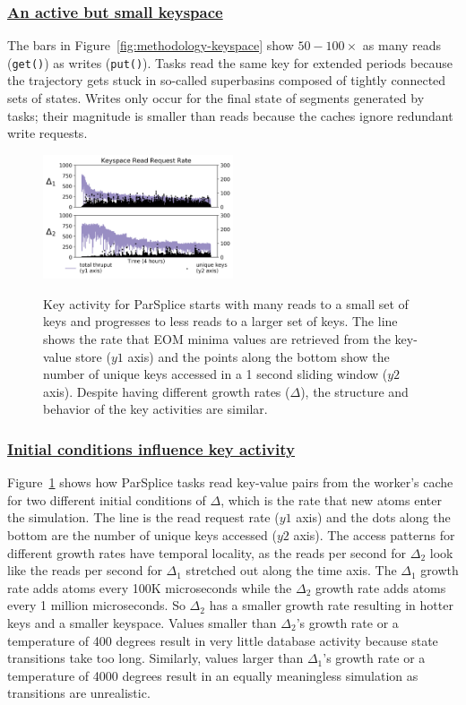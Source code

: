 \subsubsection{\underline{An active but small keyspace}}

The bars in Figure~\ref{fig:methodology-keyspace} show \(50-100\times\) as many
reads (\texttt{get()}) as writes (\texttt{put()}).  Tasks read the same key for
extended periods because the trajectory gets stuck in so-called superbasins
composed of tightly connected sets of states.  Writes only occur for the final
state of segments generated by tasks; their magnitude is smaller than reads
because the caches ignore redundant write requests. 

\begin{figure}[t]
  \noindent\includegraphics[width=0.5\textwidth]{figures/motivation-regimes.png}\\
  \caption{Key activity for ParSplice starts with many reads to a small set of
keys and progresses to less reads to a larger set of keys.  The line shows the
rate that EOM minima values are retrieved from the key-value store (\(y1\)
axis) and the points along the bottom show the number of unique keys accessed in a 1
second sliding window (\(y2\) axis). Despite having different growth rates
(\(\Delta\)), the structure and behavior of the key activities are similar.
\label{fig:motivation-regimes}}
\end{figure}

\subsubsection{\underline{Initial conditions influence key activity}}
\label{sec:delta}
Figure~\ref{fig:motivation-regimes} shows how ParSplice tasks read key-value
pairs from the worker's cache for two different initial conditions of
\(\Delta\), which is the rate that new atoms enter the simulation.  The line is
the read request rate (\(y1\) axis) and the dots along the bottom are the
number of unique keys accessed (\(y2\) axis).  The access patterns for
different growth rates have temporal locality, as the reads per second for
\(\Delta_2\) look like the reads per second for \(\Delta_1\) stretched out
along the time axis.  The \(\Delta_1\) growth rate adds atoms every 100K
microseconds while the \(\Delta_2\) growth rate adds atoms every 1 million
microseconds. So \(\Delta_2\) has a smaller growth rate resulting in hotter
keys and a smaller keyspace.  Values smaller than \(\Delta_2\)'s growth rate or
a temperature of 400 degrees result in very little database activity because
state transitions take too long. Similarly, values larger than \(\Delta_1\)'s
growth rate or a temperature of 4000 degrees result in an equally meaningless
simulation as transitions are unrealistic.  

